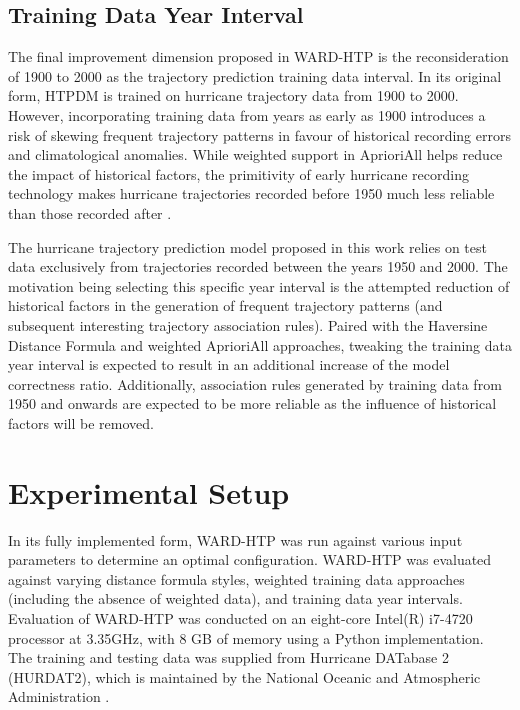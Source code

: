 \documentclass[12pt,conference]{IEEEtran}
\begin{document}
\subsection{Training Data Year Interval}

The final improvement dimension proposed in WARD-HTP is the reconsideration of 1900 to 2000 as the trajectory prediction training data interval. In its original form, HTPDM is trained on hurricane trajectory data from 1900 to 2000. However, incorporating training data from years as early as 1900 introduces a risk of skewing frequent trajectory patterns in favour of historical recording errors and climatological anomalies. While weighted support in AprioriAll helps reduce the impact of historical factors, the primitivity of early hurricane recording technology makes hurricane trajectories recorded before 1950 much less reliable than those recorded after \cite{hurricane-recording-history}.

The hurricane trajectory prediction model proposed in this work relies on test data exclusively from trajectories recorded between the years 1950 and 2000. The motivation being selecting this specific year interval is the attempted reduction of historical factors in the generation of frequent trajectory patterns (and subsequent interesting trajectory association rules). Paired with the Haversine Distance Formula and weighted AprioriAll approaches, tweaking the training data year interval is expected to result in an additional increase of the model correctness ratio. Additionally, association rules generated by training data from 1950 and onwards are expected to be more reliable as the influence of historical factors will be removed.

\section{Experimental Setup}

In its fully implemented form, WARD-HTP was run against various input parameters to determine an optimal configuration. WARD-HTP was evaluated against varying distance formula styles, weighted training data approaches (including the absence of weighted data), and training data year intervals. Evaluation of WARD-HTP was conducted on an eight-core Intel(R) i7-4720 processor at 3.35GHz, with 8 GB of memory using a Python implementation. The training and testing data was supplied from Hurricane DATabase 2 (HURDAT2), which is maintained by the National Oceanic and Atmospheric Administration \cite{HURDAT2-original}.
\end{document}
